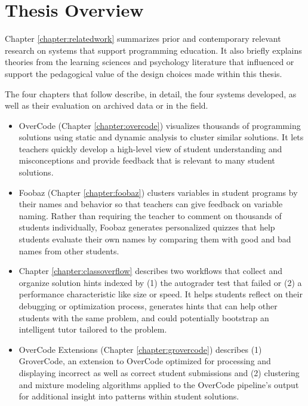 \section{Thesis Overview}

Chapter \ref{chapter:relatedwork} summarizes prior and contemporary relevant research on systems that support programming education. It also briefly explains theories from the learning sciences and psychology literature that influenced or support the pedagogical value of the design choices made within this thesis.

The four chapters that follow describe, in detail, the four systems developed, as well as their evaluation on archived data or in the field.

\begin{itemize}
\item OverCode (Chapter \ref{chapter:overcode}) visualizes thousands of programming solutions using static and dynamic analysis to cluster similar solutions. It lets teachers quickly develop a high-level view of student understanding and misconceptions and provide feedback that is relevant to many student solutions. 

\item Foobaz (Chapter \ref{chapter:foobaz}) clusters variables in student programs by their names and behavior so that teachers can give feedback on variable naming. Rather than requiring the teacher to comment on thousands of students individually, Foobaz generates personalized quizzes that help students evaluate their own names by comparing them with good and bad names from other students. 

\item Chapter \ref{chapter:classoverflow} describes two workflows that collect and organize solution hints indexed by (1) the autograder test that failed or (2) a performance characteristic like size or speed. It helps students reflect on their debugging or optimization process, generates hints that can help other students with the same problem, and could potentially bootstrap an intelligent tutor tailored to the problem.

\item OverCode Extensions (Chapter \ref{chapter:grovercode}) describes (1) GroverCode, an extension to OverCode optimized for processing and displaying incorrect as well as correct student submissions and (2) clustering and mixture modeling algorithms applied to the OverCode pipeline's output for additional insight into patterns within student solutions. %
\end{itemize}

